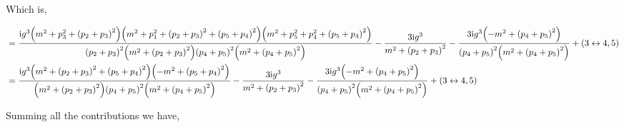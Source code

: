 Which is,

\begin{align*}
    &=\frac{\textnormal{i} g^3\qty(m^2+p_3^2+\qty(p_2+p_3)^2)\qty(m^2+p_1^2+\qty(p_2+p_3)^2+\qty(p_5+p_4)^2)\qty(m^2+p_5^2+p_4^2+\qty(p_5+p_4)^2)}{\qty(p_2+p_3)^2\qty(m^2+\qty(p_2+p_3)^2)\qty(p_4+p_5)^2\qty(m^2+\qty(p_4+p_5)^2)}-\frac{3\textnormal{i} g^3}{m^2+\qty(p_2+p_3)^2}-\frac{3\textnormal{i} g^3\qty(-m^2+\qty(p_4+p_5)^2)}{\qty(p_4+p_5)^2\qty(m^2+\qty(p_4+p_5)^2)}+\qty(3\leftrightarrow4,5)\\
    &=\frac{\textnormal{i} g^3\qty(m^2+\qty(p_2+p_3)^2+\qty(p_5+p_4)^2)\qty(-m^2+\qty(p_5+p_4)^2)}{\qty(m^2+\qty(p_2+p_3)^2)\qty(p_4+p_5)^2\qty(m^2+\qty(p_4+p_5)^2)}-\frac{3\textnormal{i} g^3}{m^2+\qty(p_2+p_3)^2}-\frac{3\textnormal{i} g^3\qty(-m^2+\qty(p_4+p_5)^2)}{\qty(p_4+p_5)^2\qty(m^2+\qty(p_4+p_5)^2)}+\qty(3\leftrightarrow4,5)
\end{align*}

Summing all the contributions we have,

